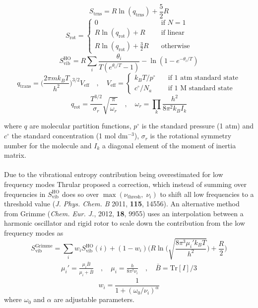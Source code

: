 \documentclass[10pt]{article}
\begin{document}
\begin{equation}
	S_\text{trns} = R  \ln(q_\text{trns}) + \frac{5}{2}R
\end{equation}
\begin{equation}
	S_\text{rot} = \begin{cases}
		0 &\quad \text{if  } N = 1 \\
		R  \ln(q_\text{rot}) + R &\quad \text{if linear} \\
		R  \ln(q_\text{rot}) + \frac{3}{2}R &\quad \text{otherwise}
	\end{cases}
\end{equation}
\begin{equation}
	S_\text{vib}^\text{HO} = R \sum_i \frac{\theta_i}{T(e^{\theta_i / T} - 1)} - \ln(1 - e^{-\theta_i / T})
\end{equation}
\begin{equation}
	q_\text{trans} = {\Big (} \frac{2\pi m k_B T}{h^2} {\Big )}^{3/2}  V_\text{eff} \quad , \quad V_\text{eff} =  \begin{cases}
		k_B T / p^{\circ} \quad&\text{if 1 atm standard state} \\
		c^\circ / N_a \quad&\text{if 1 M standard state} 
	\end{cases}
\end{equation}
\begin{equation}
	q_\text{rot} = \frac{T^{3/2}}{\sigma_r} \sqrt{\frac{\pi}{\omega_r}} \quad,\quad \omega_r = \prod_{k} \frac{h^2}{8 \pi^2 k_B I_k}
\end{equation}

where $q$ are molecular partition functions, $p^{\circ}$ is the standard pressure (1 atm) and $c^\circ$ the standard concentration (1 mol dm$^{-3}$), $\sigma_r$ is the rotational symmetry number for the molecule and $I_k$ a diagonal element of the moment of inertia matrix.
\\\\
Due to the vibrational entropy contribution being overestimated for low frequency modes Thrular proposed a correction, which instead of summing over frequencies in $S_\text{vib}^\text{HO}$ does so over $\max(\nu_\text{thresh},\; \nu_i)$ to shift all low frequencies to a threshold value (\emph{J. Phys. Chem. B} 2011, {\bfseries{115}}, 14556). An alternative method from Grimme (\emph{Chem. Eur. J.}, 2012, {\bfseries{18}}, 9955) uses an interpolation between a harmonic oscillator and rigid rotor to scale down the contribution from the low frequency modes as
\begin{equation}
	S_\text{vib}^\text{Grimme} = \sum_i w_i S_ \text{vib}^\text{HO}(i) + (1-w_i) {\Big (} R\ln {\Big (} \sqrt{\frac{8 \pi^3 \mu_i' k_B T}{h^2}} {\Big )} + \frac{R}{2} {\Big )}
\end{equation}
\begin{eqnarray}
	\mu_i' = \frac{\mu_i \bar{B}}{\mu_i + \bar{B}} \quad,\quad \mu_i = \frac{h}{8\pi^2 \nu_i} \quad,\quad \bar{B} = \text{Tr}[I] / 3
\end{eqnarray}
\begin{equation}
	w_i = \frac{1}{1 + (\omega_0/ \nu_i)^\alpha}
\end{equation}
where $\omega_0$ and $\alpha$ are adjustable parameters.
\end{document}
